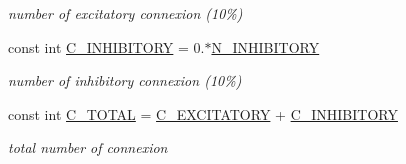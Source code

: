 \begin{DoxyCompactItemize}
\begin{DoxyCompactList}\small\item\em number of excitatory connexion (10\%) \end{DoxyCompactList}\item 
const int \hyperlink{classNetwork_a07869bbf76df13dc02f460967777f687}{C\-\_\-\-I\-N\-H\-I\-B\-I\-T\-O\-R\-Y} = 0.$\ast$\hyperlink{classNetwork_a9194d47c3f0524982ed4be54c5dec78e}{N\-\_\-\-I\-N\-H\-I\-B\-I\-T\-O\-R\-Y}
\begin{DoxyCompactList}\small\item\em number of inhibitory connexion (10\%) \end{DoxyCompactList}\item 
const int \hyperlink{classNetwork_a692a8e65e5f6f098c6569c348b1aa5d1}{C\-\_\-\-T\-O\-T\-A\-L} = \hyperlink{classNetwork_a5fa178398926b6883c68f9def650341e}{C\-\_\-\-E\-X\-C\-I\-T\-A\-T\-O\-R\-Y} + \hyperlink{classNetwork_a07869bbf76df13dc02f460967777f687}{C\-\_\-\-I\-N\-H\-I\-B\-I\-T\-O\-R\-Y}
\begin{DoxyCompactList}\small\item\em total number of connexion \end{DoxyCompactList}\end{DoxyCompactItemize}


